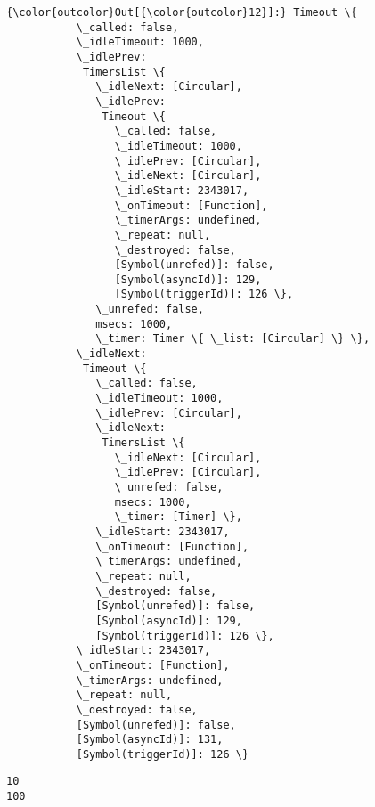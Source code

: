 \documentclass[11pt]{article}
\begin{document}
\begin{Verbatim}[commandchars=\\\{\}]
{\color{outcolor}Out[{\color{outcolor}12}]:} Timeout \{
           \_called: false,
           \_idleTimeout: 1000,
           \_idlePrev:
            TimersList \{
              \_idleNext: [Circular],
              \_idlePrev:
               Timeout \{
                 \_called: false,
                 \_idleTimeout: 1000,
                 \_idlePrev: [Circular],
                 \_idleNext: [Circular],
                 \_idleStart: 2343017,
                 \_onTimeout: [Function],
                 \_timerArgs: undefined,
                 \_repeat: null,
                 \_destroyed: false,
                 [Symbol(unrefed)]: false,
                 [Symbol(asyncId)]: 129,
                 [Symbol(triggerId)]: 126 \},
              \_unrefed: false,
              msecs: 1000,
              \_timer: Timer \{ \_list: [Circular] \} \},
           \_idleNext:
            Timeout \{
              \_called: false,
              \_idleTimeout: 1000,
              \_idlePrev: [Circular],
              \_idleNext:
               TimersList \{
                 \_idleNext: [Circular],
                 \_idlePrev: [Circular],
                 \_unrefed: false,
                 msecs: 1000,
                 \_timer: [Timer] \},
              \_idleStart: 2343017,
              \_onTimeout: [Function],
              \_timerArgs: undefined,
              \_repeat: null,
              \_destroyed: false,
              [Symbol(unrefed)]: false,
              [Symbol(asyncId)]: 129,
              [Symbol(triggerId)]: 126 \},
           \_idleStart: 2343017,
           \_onTimeout: [Function],
           \_timerArgs: undefined,
           \_repeat: null,
           \_destroyed: false,
           [Symbol(unrefed)]: false,
           [Symbol(asyncId)]: 131,
           [Symbol(triggerId)]: 126 \}
\end{Verbatim}
            
    \begin{Verbatim}[commandchars=\\\{\}]
10
100

    \end{Verbatim}
\end{document}
